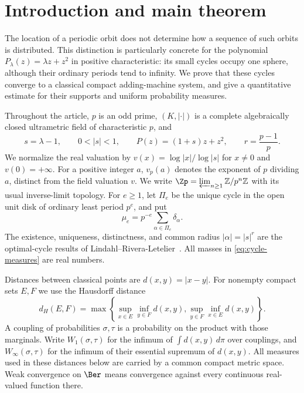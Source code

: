 \section{Introduction and main theorem}
\label{sec:introduction}

The location of a periodic orbit does not determine how a sequence of
such orbits is distributed. This distinction is particularly concrete
for the polynomial $P_\lambda(z)=\lambda z+z^2$ in positive
characteristic: its small cycles occupy one sphere, although their
ordinary periods tend to infinity. We prove that these cycles converge
to a classical compact adding-machine system, and give a quantitative
estimate for their supports and uniform probability measures.

Throughout the article, $p$ is an odd prime, $(K,|\cdot|)$ is a
complete algebraically closed ultrametric field of characteristic $p$,
and
\begin{equation}\label{eq:setup}
  s=\lambda-1,\qquad 0<|s|<1,\qquad
  P(z)=(1+s)z+z^2,\qquad r=\frac{p-1}{p}.
\end{equation}
We normalize the real valuation by
$v(x)=\log|x|/\log|s|$ for $x\ne0$ and $v(0)=+\infty$.
For a positive integer $a$, $v_p(a)$ denotes the exponent of $p$
dividing $a$, distinct from the field valuation $v$. We write
$\Zp=\varprojlim_{n\ge1}\mathbb Z/p^n\mathbb Z$ with its usual
inverse-limit topology.
For $e\ge1$, let $\Pi_e$ be the unique cycle in the open unit disk
of ordinary least period $p^e$, and put
\begin{equation}\label{eq:cycle-measures}
  \mu_e=p^{-e}\sum_{\alpha\in\Pi_e}\delta_\alpha.
\end{equation}
The existence, uniqueness, distinctness, and common radius
$|\alpha|=|s|^r$ are the optimal-cycle results of
Lindahl--Rivera-Letelier~\cite[Theorem C and the $q=1$ discussion]{lindahl2016optimal}.
All masses in \eqref{eq:cycle-measures} are real numbers.

Distances between classical points are $d(x,y)=|x-y|$. For nonempty
compact sets $E,F$ we use the Hausdorff distance
\[
 d_H(E,F)=\max\left\{\sup_{x\in E}\inf_{y\in F}d(x,y),
                         \sup_{y\in F}\inf_{x\in E}d(x,y)\right\}.
\]
A coupling of probabilities $\sigma,\tau$ is a probability on the
product with those marginals. Write $W_1(\sigma,\tau)$ for the
infimum of $\int d(x,y)\,d\pi$ over couplings, and
$W_\infty(\sigma,\tau)$ for the infimum of their essential supremum
of $d(x,y)$. All measures used in these distances below are carried
by a common compact metric space. Weak convergence on $\Ber$ means
convergence against every continuous real-valued function there.

